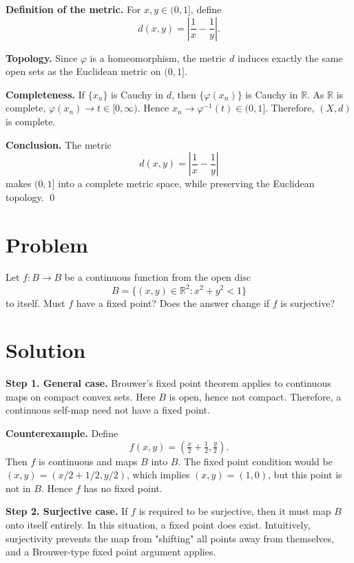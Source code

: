 \documentclass[11pt,a4paper]{article}
\theoremstyle{definition}
\theoremstyle{definition}
\theoremstyle{plain}
\theoremstyle{remark}
\begin{document}
\medskip

\textbf{Definition of the metric.}  
For $x,y\in (0,1]$, define
\[
d(x,y) = \left|\frac{1}{x} - \frac{1}{y}\right|.
\]

\medskip

\textbf{Topology.}  
Since $\varphi$ is a homeomorphism, the metric $d$ induces exactly the same open sets as the Euclidean metric on $(0,1]$.

\medskip

\textbf{Completeness.}  
If $\{x_n\}$ is Cauchy in $d$, then $\{\varphi(x_n)\}$ is Cauchy in $\mathbb{R}$. As $\mathbb{R}$ is complete, $\varphi(x_n)\to t \in [0,\infty)$. Hence $x_n \to \varphi^{-1}(t) \in (0,1]$. Therefore, $(X,d)$ is complete.

\medskip

\textbf{Conclusion.}  
The metric
\[
d(x,y) = \left| \frac{1}{x} - \frac{1}{y} \right|
\]
makes $(0,1]$ into a complete metric space, while preserving the Euclidean topology.
\qed

\section*{Problem}
Let $f : B \to B$ be a continuous function from the open disc
\[
B = \{(x,y)\in \mathbb{R}^2 : x^2+y^2 < 1\}
\]
to itself. Must $f$ have a fixed point? Does the answer change if $f$ is surjective?

\section*{Solution}
\textbf{Step 1. General case.}  
Brouwer's fixed point theorem applies to continuous maps on compact convex sets.  
Here $B$ is open, hence not compact. Therefore, a continuous self-map need not have a fixed point.  

\textbf{Counterexample.}  
Define
\[
f(x,y) = \left( \tfrac{x}{2} + \tfrac{1}{2}, \tfrac{y}{2} \right).
\]
Then $f$ is continuous and maps $B$ into $B$.  
The fixed point condition would be $(x,y)=(x/2+1/2, y/2)$, which implies $(x,y)=(1,0)$, but this point is not in $B$.  
Hence $f$ has no fixed point.

\medskip

\textbf{Step 2. Surjective case.}  
If $f$ is required to be surjective, then it must map $B$ onto itself entirely.  
In this situation, a fixed point does exist. Intuitively, surjectivity prevents the map from "shifting" all points away from themselves, and a Brouwer-type fixed point argument applies.
\end{document}
